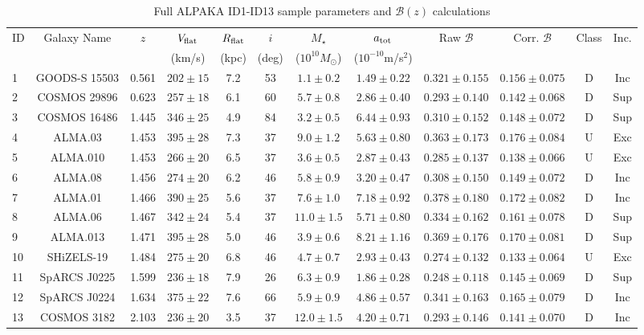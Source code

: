 \documentclass[fleqn,usenatbib]{mnras}
\begin{document}
\begin{table}
\centering
\setlength{\tabcolsep}{3pt}
\footnotesize
\begin{tabular}{lccccccccccc}
\toprule
ID & Galaxy Name & $z$ & $V_{\rm flat}$ & $R_{\rm flat}$ & $i$ & $M_\star$ & $a_{\rm tot}$ & Raw $\mathcal{B}$ & Corr. $\mathcal{B}$ & Class & Inc. \\
& & & (km/s) & (kpc) & (deg) & ($10^{10}M_\odot$) & ($10^{-10}$m/s$^2$) & & & & \\
\midrule
1 & GOODS-S 15503 & 0.561 & $202\pm15$ & 7.2 & 53 & $1.1\pm0.2$ & $1.49\pm0.22$ & $0.321\pm0.155$ & $0.156\pm0.075$ & D & Inc \\
2 & COSMOS 29896 & 0.623 & $257\pm18$ & 6.1 & 60 & $5.7\pm0.8$ & $2.86\pm0.40$ & $0.293\pm0.140$ & $0.142\pm0.068$ & D & Sup \\
3 & COSMOS 16486 & 1.445 & $346\pm25$ & 4.9 & 84 & $3.2\pm0.5$ & $6.44\pm0.93$ & $0.310\pm0.152$ & $0.148\pm0.072$ & D & Sup \\
4 & ALMA.03 & 1.453 & $395\pm28$ & 7.3 & 37 & $9.0\pm1.2$ & $5.63\pm0.80$ & $0.363\pm0.173$ & $0.176\pm0.084$ & U & Exc \\
5 & ALMA.010 & 1.453 & $266\pm20$ & 6.5 & 37 & $3.6\pm0.5$ & $2.87\pm0.43$ & $0.285\pm0.137$ & $0.138\pm0.066$ & U & Exc \\
6 & ALMA.08 & 1.456 & $274\pm20$ & 6.2 & 46 & $5.8\pm0.9$ & $3.20\pm0.47$ & $0.308\pm0.150$ & $0.149\pm0.072$ & D & Inc \\
7 & ALMA.01 & 1.466 & $390\pm25$ & 5.6 & 37 & $7.6\pm1.0$ & $7.18\pm0.92$ & $0.378\pm0.180$ & $0.172\pm0.082$ & D & Inc \\
8 & ALMA.06 & 1.467 & $342\pm24$ & 5.4 & 37 & $11.0\pm1.5$ & $5.71\pm0.80$ & $0.334\pm0.162$ & $0.161\pm0.078$ & D & Sup \\
9 & ALMA.013 & 1.471 & $395\pm28$ & 5.0 & 46 & $3.9\pm0.6$ & $8.21\pm1.16$ & $0.369\pm0.176$ & $0.170\pm0.081$ & D & Sup \\
10 & SHiZELS-19 & 1.484 & $275\pm20$ & 6.8 & 46 & $4.7\pm0.7$ & $2.93\pm0.43$ & $0.274\pm0.132$ & $0.133\pm0.064$ & U & Exc \\
11 & SpARCS J0225 & 1.599 & $236\pm18$ & 7.9 & 26 & $6.3\pm0.9$ & $1.86\pm0.28$ & $0.248\pm0.118$ & $0.145\pm0.069$ & D & Sup \\
12 & SpARCS J0224 & 1.634 & $375\pm22$ & 7.6 & 66 & $5.9\pm0.9$ & $4.86\pm0.57$ & $0.341\pm0.163$ & $0.165\pm0.079$ & D & Inc \\
13 & COSMOS 3182 & 2.103 & $236\pm20$ & 3.5 & 37 & $12.0\pm1.5$ & $4.20\pm0.71$ & $0.293\pm0.146$ & $0.141\pm0.070$ & D & Inc \\
\bottomrule
\end{tabular}
\caption{Full ALPAKA ID1-ID13 sample parameters and $\mathcal{B}(z)$ calculations}
\label{tab:alpaka_full}
\end{table}
\end{document}
